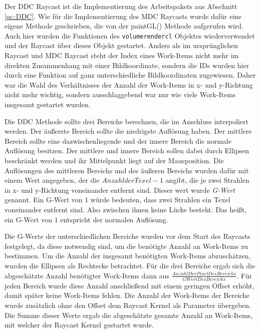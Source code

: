Der DDC Raycast ist die Implementierung des Arbeitspakets aus Abschnitt \ref{ss::DDC}.
Wie für die Implementierung des MDC Raycasts wurde dafür eine eigene Methode geschrieben, die von der paintGL() Methode aufgerufen wird.
Auch hier wurden die Funktionen des \texttt{volumerendercl} Objektes wiederverwendet und der Raycast über dieses Objekt gestartet.
Anders als im ursprünglichen Raycast und MDC Raycast steht der Index eines Work-Items nicht mehr im direkten Zusammenhang mit einer Bildkoordinate, sondern die IDs wurden hier durch eine Funktion auf ganz unterschiedliche Bildkoordinaten zugewiesen.
Daher war die Wahl des Verhältnisses der Anzahl der Work-Items in x- und y-Richtung nicht mehr wichtig, sondern ausschlaggebend war nur wie viele Work-Items insgesamt gestartet wurden.

Die DDC Methode sollte drei Bereiche berechnen, die im Anschluss interpoliert werden.
Der äußerste Bereich sollte die niedrigste Auflösung haben.
Der mittlere Bereich sollte eine dazwischenliegende und der innere Bereich die normale Auflösung besitzen.
Der mittlere und innere Bereich sollen dabei durch Ellipsen beschränkt werden und ihr Mittelpunkt liegt auf der Mausposition.
Die Auflösungen des mittleren Bereichs und des äußeren Bereichs wurden dafür mit einem Wert angegeben, der die $Anzahl der Texel - 1$ angibt, die je zwei Strahlen in x- und y-Richtung voneinander entfernt sind.
Dieser wert wurde \emph{G-Wert} genannt.
Ein G-Wert von $1$ würde bedeuten, dass zwei Strahlen ein Texel voneinander entfernt sind.
Also zwischen ihnen keine Lücke besteht.
Das heißt, ein G-Wert von $1$ entspricht der normalen Auflösung.

Die G-Werte der unterschiedlichen Bereiche wurden vor dem Start des Raycasts festgelegt, da diese notwendig sind, um die benötigte Anzahl an Work-Items zu bestimmen.
Um die Anzahl der insgesamt benötigten Work-Items abzuschätzen, wurden die Ellipsen als Rechtecke betrachtet.
Für die drei Bereiche ergab sich die abgeschätzte Anzahl benötigter Work-Items dann aus $\frac{AnzahlDerPixelDesBereichs}{GWertDesBereichs}$.
Für jeden Bereich wurde diese Anzahl anschließend mit einem geringen Offset erhöht, damit später keine Work-Items fehlen.
Die Anzahl der Work-Items der Bereiche wurde zusätzlich ohne den Offset dem Raycast Kernel als Parameter übergeben.
Die Summe dieser Werte ergab die abgeschätzte gesamte Anzahl an Work-Items, mit welcher der Raycast Kernel gestartet wurde.


